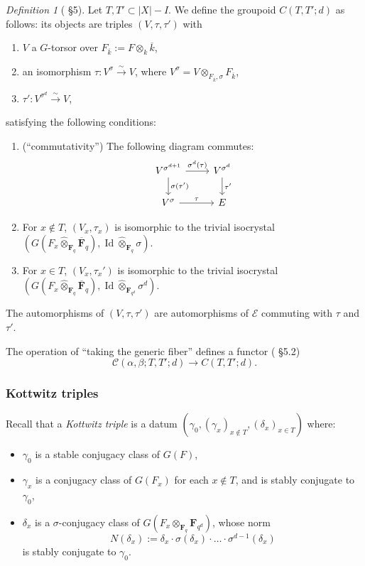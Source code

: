 \documentclass[reqno]{amsart}
\numberwithin{equation}{section}
\newcommand{\F}{\mathbf{F}}
\newcommand{\ol}[1]{\overline{#1}}
\newcommand{\wh}[1]{\widehat{#1}}
\newcommand{\Cal}[1]{\mathcal{#1}}
\newcommand{\co}{\colon}
\DeclareMathOperator{\Id}{Id}
\theoremstyle{remark}
\newtheorem{defn}[thm]{Definition}
\numberwithin{equation}{section}
\begin{document}
\begin{defn}[\cite{NgoNgo} \S 5] Let $T, T' \subset |X| - I $. We define the groupoid $C(T,T';d)$ as follows: its objects are triples $(V, \tau, \tau')$ with 
\begin{enumerate}
\item $V$ a $G$-torsor over $F_{\ol{k}} := F\otimes_k \ol{k}$, 
\item an isomorphism $\tau \co V^{\sigma}\xrightarrow{\sim} V$, where $V^{\sigma} = V \otimes_{F_{\ol{k}}, \sigma} F_{\ol{k}}$,
\item $\tau' \co V^{\sigma^d} \xrightarrow{\sim}V$,
\end{enumerate}
satisfying the following conditions:
\begin{enumerate}
\item (``commutativity'') The following diagram commutes:
\[
\begin{tikzcd}
V^{\sigma^{d+1}} \ar[r, "\sigma^d(\tau)"] \ar[d, "\sigma(\tau')"] & V^{\sigma^d} \ar[d, "\tau'"] \\
V^{\sigma} \ar[r, "\tau"] & E 
\end{tikzcd}
\]
\item For $x \notin T$, $(V_x, \tau_x)$ is isomorphic to the trivial isocrystal $(G(F_x \wh{\otimes}_{\F_q} \ol{\F}_q), \Id \wh{\otimes}_{\F_q} \sigma)$. 
\item For $x \in T$, $(V_x, \tau_x')$ is isomorphic to the trivial isocrystal $(G(F_x \wh{\otimes}_{\F_q}  \ol{\F}_q), \Id \wh{\otimes}_{\F_{q^d}} \sigma^d)$.
\end{enumerate}
The automorphisms of $(V, \tau, \tau')$ are automorphisms of $\Cal{E}$ commuting with $\tau$ and $\tau'$. 
\end{defn}


The operation of ``taking the generic fiber'' defines a functor (\cite{NgoNgo} \S 5.2)
\[
\Cal{C}(\alpha,\beta; T,T'; d) \rightarrow C(T,T' ;d). 
\]

\subsubsection{Kottwitz triples} Recall that a \emph{Kottwitz triple} is a datum $(\gamma_0, (\gamma_x)_{x \notin T}, (\delta_x)_{x \in T})$ where:
\begin{itemize}
\item $\gamma_0 $ is a stable conjugacy class of $G(F)$,
\item $\gamma_x$ is a conjugacy class of $G(F_x)$ for each $x \notin T$, and is stably conjugate to $\gamma_0$,
\item $\delta_x$ is a $\sigma$-conjugacy class of  $G(F_x \wh{\otimes}_{\F_q} \F_{q^d})$, whose norm 
\[
N(\delta_x) := \delta_x  \cdot \sigma( \delta_x) \cdot \ldots \cdot \sigma^{d-1}(  \delta_x) 
\]
is stably conjugate to $\gamma_0$. 
\end{itemize}
\end{document}
